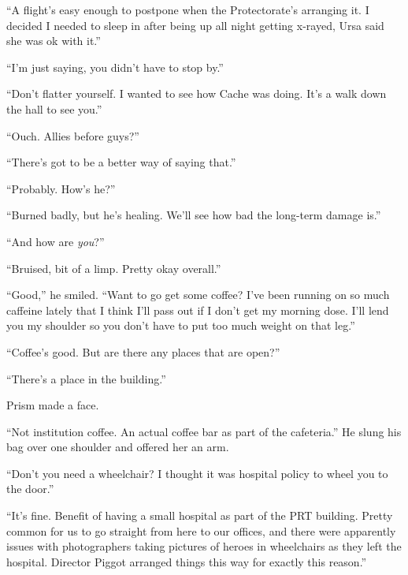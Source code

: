 ``A flight's easy enough to postpone when the Protectorate's arranging it.  I decided I needed to sleep in after being up all night getting x-rayed, Ursa said she was ok with it.''



``I'm just saying, you didn't have to stop by.''



``Don't flatter yourself.  I wanted to see how Cache was doing.  It's a walk down the hall to see you.''



``Ouch.  Allies before guys?''



``There's got to be a better way of saying that.''



``Probably.  How's he?''



``Burned badly, but he's healing.  We'll see how bad the long-term damage is.''



``And how are \emph{you}?''



``Bruised, bit of a limp.  Pretty okay overall.''



``Good,'' he smiled.  ``Want to go get some coffee?  I've been running on so much caffeine lately that I think I'll pass out if I don't get my morning dose.  I'll lend you my shoulder so you don't have to put too much weight on that leg.''



``Coffee's good.  But are there any places that are open?''



``There's a place in the building.''



Prism made a face.



``Not institution coffee.  An actual coffee bar as part of the cafeteria.''  He slung his bag over one shoulder and offered her an arm.



``Don't you need a wheelchair?  I thought it was hospital policy to wheel you to the door.''



``It's fine.  Benefit of having a small hospital as part of the PRT building.  Pretty common for us to go straight from here to our offices, and there were apparently issues with photographers taking pictures of heroes in wheelchairs as they left the hospital.  Director Piggot arranged things this way for exactly this reason.''



